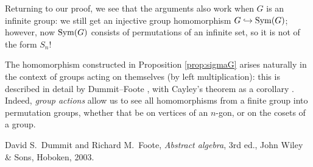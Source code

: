 \documentclass[11pt, reqno]{amsart}
\begin{document}
Returning to our proof, we see that the arguments also work when $G$ is an infinite group: we still get an injective group homomorphism $G \hookrightarrow \operatorname{Sym}(G)$; however, now $\operatorname{Sym}(G)$ consists of permutations of an infinite set, so it is not of the form $S_n$!  

The homomorphism constructed in Proposition \ref{prop:sigmaG} arises naturally in the context of groups acting on themselves (by left multiplication): this is described in detail by Dummit--Foote \cite[\S 4.2]{DummitFoote}, with Cayley's theorem as a corollary \cite[\S 4.2, Corollary 4, p.~120]{DummitFoote}.  Indeed, \emph{group actions} allow us to see all homomorphisms from a finite group into permutation groups, whether that be on vertices of an $n$-gon, or on the cosets of a group.  

\begin{thebibliography}{99}


David S.~Dummit and Richard M.~Foote, \emph{Abstract algebra}, 3rd ed., John Wiley \& Sons, Hoboken, 2003.


\end{thebibliography}
\end{document}
